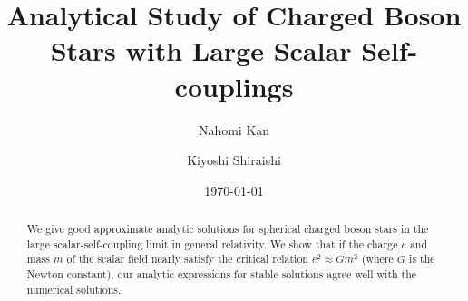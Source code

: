 \documentclass[
aps,prd,
12pt,%
nopreprintnumbers,
showpacs,
eqsecnum,
nofootinbib
]{revtex4-1}
\begin{document}
\title{Analytical Study of Charged Boson Stars with Large
Scalar Self-couplings
}
\author{Nahomi Kan}
\author{Kiyoshi Shiraishi}
\date{\today}

\begin{abstract}
We give good approximate analytic solutions for
spherical charged boson stars in the large scalar-self-coupling limit in general
relativity. We show that if the charge $e$ and mass $m$ of the scalar field nearly
satisfy the critical relation $e^2\approx Gm^2$ (where $G$ is the Newton constant),
our analytic expressions for stable solutions
agree well with the numerical solutions. 
\end{abstract}



\maketitle
\end{document}

